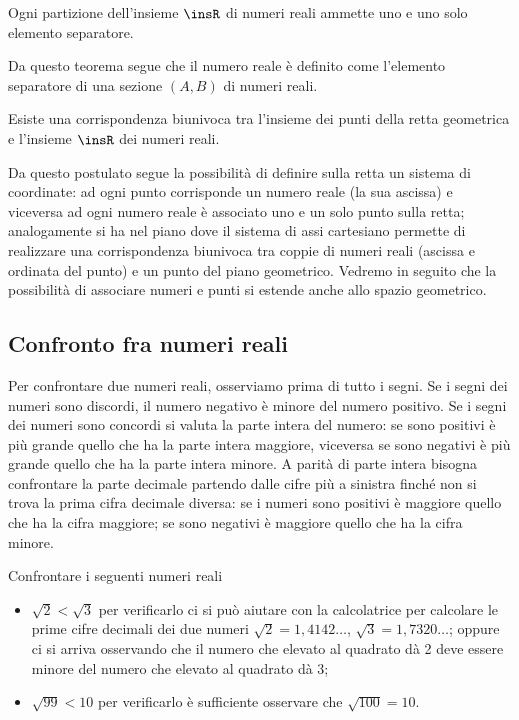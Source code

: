 \begin{teorema}[di Dedekind]
Ogni partizione dell'insieme $\insR$ di numeri reali ammette uno e uno solo elemento separatore.
\end{teorema}

Da questo teorema segue che il numero reale è definito come l'elemento separatore di una sezione $(A,B)$ di numeri reali.

\begin{postulato}
Esiste una corrispondenza biunivoca tra l'insieme dei punti della retta geometrica e l'insieme $\insR$ dei numeri reali.
\end{postulato}

Da questo postulato segue la possibilità di definire sulla retta un sistema di coordinate: ad ogni punto corrisponde un numero reale (la sua ascissa) e viceversa ad ogni numero reale è associato uno e un solo punto sulla retta; analogamente si ha nel piano dove il sistema di assi cartesiano permette di realizzare una corrispondenza biunivoca tra coppie di numeri reali (ascissa e ordinata del punto) e un punto del piano geometrico. Vedremo in seguito che la possibilità di associare numeri e punti si estende anche allo spazio geometrico.

\subsection{Confronto fra numeri reali}
Per confrontare due numeri reali, osserviamo prima di tutto i segni. Se i segni dei numeri sono
discordi, il numero negativo è minore del numero positivo. Se i segni dei numeri sono concordi si valuta la parte intera del numero: se sono positivi è più grande quello che ha la parte intera maggiore, viceversa se sono negativi è più grande quello che ha la parte intera minore. A parità di parte intera bisogna confrontare la parte decimale partendo dalle cifre più a sinistra finché non si trova la prima cifra decimale diversa: se i numeri sono positivi è maggiore quello che ha la cifra maggiore; se sono negativi è maggiore quello che ha la cifra minore.

\begin{exrig}
 \begin{esempio}
 Confrontare i seguenti numeri reali
 \begin{itemize}
 \item $\sqrt{2}<\sqrt{3}$ per verificarlo ci si può aiutare con la calcolatrice per calcolare le prime cifre decimali dei due numeri $\sqrt{2}=1,4142\ldots$, $\sqrt{3}=1,7320\ldots$; oppure ci si arriva osservando che il numero che elevato al quadrato dà 2 deve essere minore del numero che elevato al quadrato dà 3;
 \item $\sqrt{99}<10$ per verificarlo è sufficiente osservare che $\sqrt{100}=10$.
 \end{itemize}
 \end{esempio}
\end{exrig}
\ovalbox{\risolvii \ref{ese:1.3}, \ref{ese:1.4}, \ref{ese:1.5}, \ref{ese:1.6}, \ref{ese:1.7}}\vspazio

